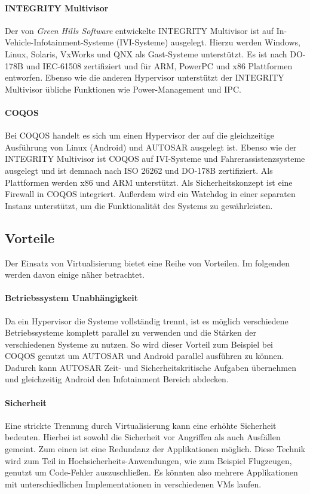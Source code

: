 \documentclass[
  a4paper,					    %
  twoside,
  DIV=calc,     				%
  bibliography=totoc,
  cleardoublepage=empty,
  ngerman,     					%
  final       					%
]{scrbook}
\begin{document}
\paragraph{INTEGRITY Multivisor}
Der von \emph{Green Hills Software} entwickelte INTEGRITY Multivisor ist auf In-Vehicle-Infotainment-Systeme (IVI-Systeme) ausgelegt. Hierzu werden Windows, Linux, Solaris, VxWorks und QNX als Gast-Systeme unterstützt. Es ist nach DO-178B und IEC-61508 zertifiziert und für ARM, PowerPC und x86 Plattformen entworfen. Ebenso wie die anderen Hypervisor unterstützt der INTEGRITY Multivisor übliche Funktionen wie Power-Management und IPC.

\paragraph{COQOS}
Bei COQOS handelt es sich um einen Hypervisor der auf die gleichzeitige Ausführung von Linux (Android) und AUTOSAR ausgelegt ist. Ebenso wie der INTEGRITY Multivisor ist COQOS auf IVI-Systeme und Fahrerassistenzsysteme ausgelegt und ist demnach nach ISO 26262 und DO-178B zertifiziert. Als Plattformen werden x86 und ARM unterstützt. Als Sicherheitskonzept ist eine Firewall in COQOS integriert. Außerdem wird ein Watchdog in einer separaten Instanz unterstützt, um die Funktionalität des Systems zu gewährleisten.



\subsection{Vorteile}
Der Einsatz von Virtualisierung bietet eine Reihe von Vorteilen\cite{wiki:emb_hyp}. Im folgenden werden davon einige näher betrachtet.

\paragraph{Betriebssystem Unabhängigkeit}
Da ein Hypervisor die Systeme vollständig trennt, ist es möglich verschiedene Betriebssysteme komplett parallel zu verwenden und die Stärken der verschiedenen Systeme zu nutzen. So wird dieser Vorteil zum Beispiel bei COQOS genutzt um AUTOSAR und Android parallel ausführen zu können. Dadurch kann AUTOSAR Zeit- und Sicherheitskritische Aufgaben übernehmen und gleichzeitig Android den Infotainment Bereich abdecken.

\paragraph{Sicherheit}
Eine strickte Trennung durch Virtualisierung kann eine erhöhte Sicherheit bedeuten. Hierbei ist sowohl die Sicherheit vor Angriffen als auch Ausfällen gemeint. Zum einen ist eine Redundanz der Applikationen möglich. Diese Technik wird zum Teil in Hochsicherheits-Anwendungen, wie zum Beispiel Flugzeugen, genutzt um Code-Fehler auszuschließen. Es könnten also mehrere Applikationen mit unterschiedlichen Implementationen in verschiedenen VMs laufen.
\end{document}
